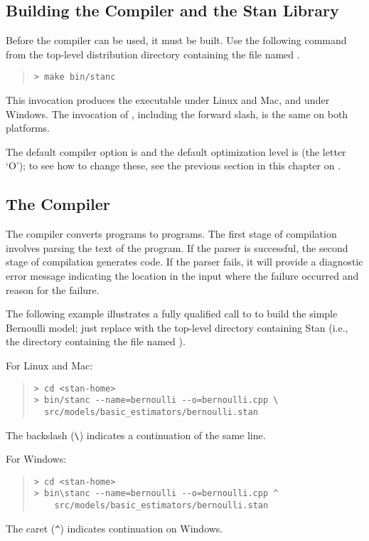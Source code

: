 \subsection{Building the \stanc Compiler and the Stan Library}

Before the \stanc compiler can be used, it must be built.  Use the
following command from the top-level distribution directory containing
the file named .
%
\begin{quote}
\begin{Verbatim}[fontshape=sl]
> make bin/stanc
\end{Verbatim}
\end{quote}
%
This invocation produces the executable  under Linux
and Mac, and  under Windows.  The invocation of
, including the forward slash, is the same on both platforms.

The default compiler option is  and the default
optimization level is  (the letter `O');  to see how to
change these, see the previous section in this chapter on .


\subsection{The \stanc Compiler}

The \stanc compiler converts \Stan programs to \Cpp programs.  The
first stage of compilation involves parsing the text of the \Stan
program.  If the parser is successful, the second stage of compilation
generates \Cpp code.  If the parser fails, it will provide a
diagnostic error message indicating the location in the input where
the failure occurred and reason for the failure.

The following example illustrates a fully qualified call to \stanc
to build the simple Bernoulli model; just replace 
with the top-level directory containing Stan (i.e., the directory
containing the file named ). 

For Linux and Mac:
%
\begin{quote}
\begin{Verbatim}[fontshape=sl]
> cd <stan-home>
> bin/stanc --name=bernoulli --o=bernoulli.cpp \
  src/models/basic_estimators/bernoulli.stan 
\end{Verbatim}
\end{quote}
%
The backslash (\Verb|\|) indicates a continuation of the same line.

For Windows:
%
\begin{quote}
\begin{Verbatim}[fontshape=sl]
> cd <stan-home>
> bin\stanc --name=bernoulli --o=bernoulli.cpp ^
    src/models/basic_estimators/bernoulli.stan 
\end{Verbatim}
\end{quote}
%
The caret (\Verb|^|) indicates continuation on Windows.

